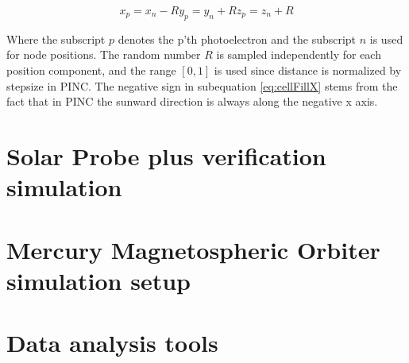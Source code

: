 \begin{subequations}
    \begin{equation}\label{eq:cellFillX}
        x_{p} = x_{n} - R
    \end{equation}
    \begin{equation}
        y_{p} = y_{n} + R
    \end{equation}
    \begin{equation}
        z_{p} = z_{n} + R
    \end{equation}
\end{subequations}

Where the subscript $p$ denotes the p'th photoelectron and the subscript $n$ is used for node positions. The random number $R$ is sampled independently for each position component, and the range $[0,1]$ is used since distance is normalized by stepsize in PINC. The negative sign in subequation \ref{eq:cellFillX} stems from the fact that in PINC the sunward direction is always along the negative x axis.



\section{Solar Probe plus verification simulation}

\section{Mercury Magnetospheric Orbiter simulation setup}

\section{Data analysis tools}